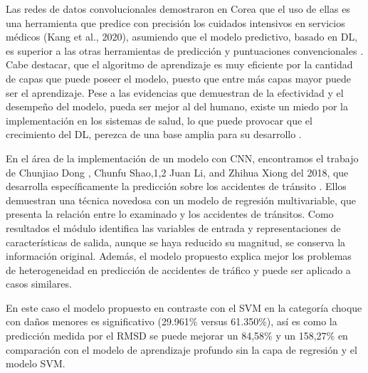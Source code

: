 \par Las redes de datos convolucionales demostraron en Corea que el uso de ellas es una herramienta que predice con precisión los cuidados intensivos en servicios médicos (Kang et al., 2020), asumiendo que el modelo predictivo, basado en DL, es superior a las otras herramientas de predicción y puntuaciones convencionales \cite{Bioetica2022}. Cabe destacar, que el algoritmo de aprendizaje es muy eficiente por la cantidad de capas que puede poseer el modelo, puesto que entre más capas mayor puede ser el aprendizaje. Pese a las evidencias que demuestran de la efectividad y el desempeño del modelo, pueda ser mejor al del humano, existe un miedo por la implementación en los sistemas de salud, lo que puede provocar que el crecimiento del DL, perezca de una base amplia para su desarrollo \cite{Nagendran2020}.\\

\par En el área de la implementación de un modelo con CNN, encontramos el trabajo de Chunjiao Dong , Chunfu Shao,1,2 Juan Li, and Zhihua Xiong del 2018, que desarrolla específicamente la predicción sobre los accidentes de tránsito \cite{shao2018improved}. Ellos demuestran una técnica novedosa con un modelo de regresión multivariable, que presenta la relación entre lo examinado y los accidentes de tránsitos. Como resultados el módulo identifica las variables de entrada y representaciones de características de salida, aunque se haya reducido su magnitud, se conserva la información original. Además, el modelo propuesto explica mejor los problemas de heterogeneidad en predicción de accidentes de tráfico y puede ser aplicado a casos similares.\\

\par En este caso el modelo propuesto en contraste con el SVM en la categoría choque con daños menores es significativo (29.961\% versus 61.350\%), así es como la predicción medida por el RMSD se puede mejorar un  84,58\% y un 158,27\% en comparación con el modelo de aprendizaje profundo sin la capa de regresión y el modelo SVM.\\





